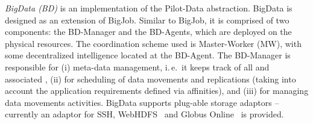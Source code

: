 \documentclass[conference]{IEEEtran}
\begin{document}
% 

{\it BigData (BD)} is an implementation of the Pilot-Data abstraction. BigData
is designed as an extension of BigJob. Similar to BigJob, it is comprised of
two components: the BD-Manager and the BD-Agents, which are deployed on the
physical resources. The coordination scheme used is Master-Worker (MW), with
some decentralized intelligence located at the BD-Agent. The BD-Manager is
responsible for (i) meta-data management, i.\,e.\ it keeps track of all \pd
and associated \dus, (ii) for scheduling of data movements and replications
(taking into account the application requirements defined via affinities), and
(iii) for managing data movements activities. BigData supports plug-able
storage adaptors -- currently an adaptor for SSH, WebHDFS~\cite{webhdfs} and
Globus Online~\cite{10.1109/MIC.2011.64} is provided.



\end{document}
